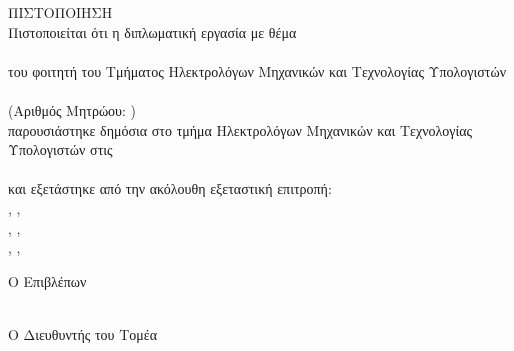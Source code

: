 \pagestyle{empty}
\begin{center}
{\LARGE ΠΙΣΤΟΠΟΙΗΣΗ\\[1cm]}
\large Πιστοποιείται ότι η διπλωματική εργασία με θέμα\\[1cm]
\textbf{\bf \large \doctitle }\\[1cm]
του φοιτητή του Τμήματος Ηλεκτρολόγων Μηχανικών και Τεχνολογίας Υπολογιστών\\[1cm]
\textbf{\metonoiF}\\[0.5cm]
(Αριθμός Μητρώου: \studnum)\\[1cm]
παρουσιάστηκε δημόσια στο τμήμα  Ηλεκτρολόγων Μηχανικών και Τεχνολογίας Υπολογιστών στις\\[1cm]
\Large{\imerominiaExetasis}\\[1cm]
\large και εξετάστηκε από την ακόλουθη εξεταστική επιτροπή:\\[1cm]
\supname, \suptitle, \uoP\\[0.2cm]
\epitropiEna, \epitropiEnaTitle, \uoP\\[0.2cm]
\epitropiDyo, \epitropiDyoTitle, \uoP\\[1cm]
\end{center}
\begin{minipage}{0.5\textwidth}
\begin{flushleft} \large
Ο Επιβλέπων\\[0.5cm]
\supname\\
\emph{\suptitle}
\end{flushleft}
\end{minipage}
\begin{minipage}{0.5\textwidth}
\begin{flushright} \large
Ο Διευθυντής του Τομέα\\[0.5cm]
\headofdivision\\
\emph{\headofdivisiontitle}
\end{flushright}
\end{minipage}